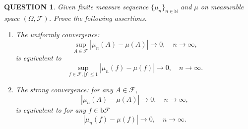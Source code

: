 \documentclass[12pt]{article}
\renewcommand{\(}{\left(}%
\renewcommand{\)}{\right)}%
\renewcommand{\[}{\left[}%
\renewcommand{\]}{\right]}%
\newcommand{\n}{\mathbb{N}}
\newcommand{\f}{\mathscr{F}}
\newtheorem{question}{QUESTION}[section]}
\begin{document}
  \begin{question}
  	Given finite measure sequence $\{\mu_n\}_{n\in\n}$ and $\mu$ on measurable space $(\Omega ,\f)$. Prove the following assertions.
  	\begin{enumerate}
  		\item The uniformly convergence: 
  		\begin{equation*}
  			\sup_{A\in\f }|\mu_n(A)-\mu(A)|\to0,\quad n\to\infty,
  		\end{equation*} 
  		is equivalent to 
  		\begin{equation*}
  			\sup_{f\in\f,|f|\leq 1}|\mu_n(f)-\mu(f)|\to 0,\quad n\to\infty.
  		\end{equation*}
  		\item The strong convergence: for any $A\in\f$,
  		\begin{equation*}
  			|\mu_n(A)-\mu(A)|\to0,\quad n\to\infty,
  		\end{equation*} 
  		is equivalent to for any $f\in \mathrm{b}\f$
  		\begin{equation*}
  			|\mu_n(f)-\mu(f)|\to 0,\quad n\to\infty.
  		\end{equation*}
  	\end{enumerate}
  \end{question}
\end{document}
